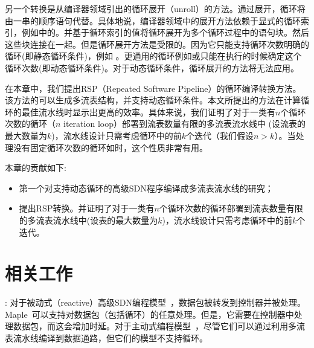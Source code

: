 另一个转换是从编译器领域引出的循环展开（unroll）的方法。通过展开，循环将由一串的顺序语句代替。具体地说，编译器领域中的展开方法依赖于显式的循环索引，例如中的。并基于循环索引的值将循环展开为多个循环过程中的语句块。然后这些块连接在一起。但是循环展开方法是受限的。因为它只能支持循环次数明确的循环(即静态循环条件)，例如 。更通用的循环例如或只能在执行的时候确定这个循环次数(即动态循环条件)。对于动态循环条件，循环展开的方法将无法应用。

在本章中，我们提出RSP（Repeated Software Pipeline）的循环编译转换方法。该方法的可以生成多流表结构，并支持动态循环条件。本文所提出的方法在计算循环的最佳流水线时显示出更高的效率。具体来说，我们证明了对于一类有$n$个循环次数的循环（$n$ iteration loop）部署到流表数量有限的多流表流水线中 (设流表的最大数量为$k$)，流水线设计只需考虑循环中的前$k$个迭代（我们假设$n > k$）。当处理没有固定循环次数的循环如时，这个性质非常有用。

本章的贡献如下:
\begin{itemize}
    \item 第一个对支持动态循环的高级SDN程序编译成多流表流水线的研究；
    \item 提出RSP转换。并证明了对于一类有$n$个循环次数的循环部署到流表数量有限的多流表流水线中(设表的最大数量为$k$)，流水线设计只需考虑循环中的前$k$个迭代。
\end{itemize}


\section{相关工作}
\label{sec:related-work}

:  对于被动式（reactive）高级SDN编程模型~\cite{voellmy2013maple,foster2011frenetic,monsanto2013composing}，数据包被转发到控制器并被处理。Maple~\cite{voellmy2013maple}可以支持对数据包（包括循环）的任意处理。但是，它需要在控制器中处理数据包，而这会增加时延。对于主动式编程模型~\cite{snap,sivaraman2016packet}，尽管它们可以通过利用多流表流水线编译到数据通路，但它们的模型不支持循环。

